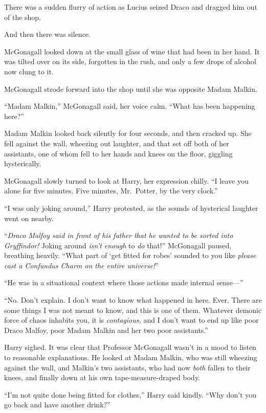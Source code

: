 There was a sudden flurry of action as Lucius seized Draco and dragged him out of the shop.

And then there was silence.

McGonagall looked down at the small glass of wine that had been in her hand. It was tilted over on its side, forgotten in the rush, and only a few drops of alcohol now clung to it.

McGonagall strode forward into the shop until she was opposite Madam Malkin.

“Madam Malkin,” McGonagall said, her voice calm. “What has been happening here?”

Madam Malkin looked back silently for four seconds, and then cracked up. She fell against the wall, wheezing out laughter, and that set off both of her assistants, one of whom fell to her hands and knees on the floor, giggling hysterically.

McGonagall slowly turned to look at Harry, her expression chilly. “I leave you alone for five minutes. Five minutes, Mr.~Potter, by the very clock.”

“I was only joking around,” Harry protested, as the sounds of hysterical laughter went on nearby.

“\emph{Draco Malfoy said in front of his father that he wanted to be sorted into Gryffindor!} Joking around \emph{isn’t enough} to \emph{do} that!” McGonagall paused, breathing heavily. “What part of ‘get fitted for robes’ sounded to you like \emph{please cast a Confundus Charm on the entire universe!}”

“He was in a situational context where those actions made internal sense—”

“No. Don’t explain. I don’t want to know what happened in here. Ever. There are some things I was not meant to know, and this is one of them. Whatever demonic force of chaos inhabits you, it is \emph{contagious,} and I don’t want to end up like poor Draco Malfoy, poor Madam Malkin and her two poor assistants.”

Harry sighed. It was clear that Professor McGonagall wasn’t in a mood to listen to reasonable explanations. He looked at Madam Malkin, who was still wheezing against the wall, and Malkin’s two assistants, who had now \emph{both} fallen to their knees, and finally down at his own tape-measure-draped body.

“I’m not quite done being fitted for clothes,” Harry said kindly. “Why don’t you go back and have another drink?”


